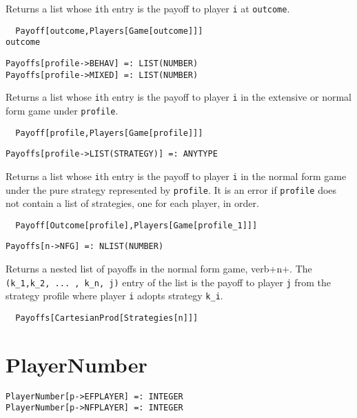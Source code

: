 \noindent
Returns a list whose \verb+i+th entry is the payoff to player \verb+i+
at \verb+outcome+.

\udfbody
\begin{verbatim}
  Payoff[outcome,Players[Game[outcome]]]
outcome
\end{verbatim} 

\newsignature

\begin{verbatim}
Payoffs[profile->BEHAV] =: LIST(NUMBER) 
Payoffs[profile->MIXED] =: LIST(NUMBER) 
\end{verbatim}

\noindent
Returns a list whose \verb+i+th entry is the payoff to player \verb+i+
in the extensive or normal form game under \verb+profile+.

\udfbody
\begin{verbatim}
  Payoff[profile,Players[Game[profile]]]
\end{verbatim} 

\newsignature

\begin{verbatim}
Payoffs[profile->LIST(STRATEGY)] =: ANYTYPE 
\end{verbatim}

\noindent
Returns a list whose \verb+i+th entry is the payoff to player \verb+i+
in the normal form game under the pure strategy represented by \verb+profile+.
It is an error if \verb+profile+ does not contain a list of
strategies, one for each player, in order.  

\udfbody
\begin{verbatim}
  Payoff[Outcome[profile],Players[Game[profile_1]]]
\end{verbatim} 

\newsignature

\begin{verbatim}
Payoffs[n->NFG] =: NLIST(NUMBER) 
\end{verbatim}

\noindent
Returns a nested list of payoffs in the normal form game, verb+n+.
The \verb+(k_1,k_2, ... , k_n, j)+ entry of the list is the payoff to
player \verb+j+ from the strategy profile where player \verb+i+ adopts
strategy \verb+k_i+.

\udfbody
\begin{verbatim}
  Payoffs[CartesianProd[Strategies[n]]]
\end{verbatim} 


\section*{PlayerNumber}\label{ExtPlayerNumber}
\begin{verbatim}
PlayerNumber[p->EFPLAYER] =: INTEGER 
PlayerNumber[p->NFPLAYER] =: INTEGER 
\end{verbatim}

